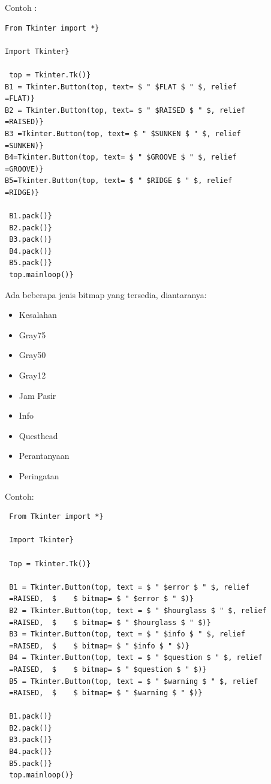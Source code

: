 \vspace{12pt}
Contoh : 
\begin{verbatim}
From Tkinter import *} 

Import Tkinter} 

 top = Tkinter.Tk()} 
B1 = Tkinter.Button(top, text= $ " $FLAT $ " $, relief
=FLAT)} 
B2 = Tkinter.Button(top, text= $ " $RAISED $ " $, relief
=RAISED)} 
B3 =Tkinter.Button(top, text= $ " $SUNKEN $ " $, relief
=SUNKEN)} 
B4=Tkinter.Button(top, text= $ " $GROOVE $ " $, relief
=GROOVE)} 
B5=Tkinter.Button(top, text= $ " $RIDGE $ " $, relief
=RIDGE)} 

 B1.pack()} 
 B2.pack()} 
 B3.pack()} 
 B4.pack()} 
 B5.pack()} 
 top.mainloop()} 
 \end{verbatim}
 
Ada beberapa jenis bitmap yang tersedia, diantaranya:  
\begin{itemize}
\item Kesalahan 
 
\item Gray75 
 
\item Gray50 
 
\item Gray12 
 
\item Jam Pasir 
 
\item Info 
 
\item Questhead 
 
\item Perantanyaan  
 
\item Peringatan\end{itemize}
 
\vspace{12pt}
Contoh: 
\begin{verbatim}
 From Tkinter import *} 
 
 Import Tkinter} 

 Top = Tkinter.Tk()} 

 B1 = Tkinter.Button(top, text = $ " $error $ " $, relief
 =RAISED,  $    $ bitmap= $ " $error $ " $)} 
 B2 = Tkinter.Button(top, text = $ " $hourglass $ " $, relief
 =RAISED,  $    $ bitmap= $ " $hourglass $ " $)} 
 B3 = Tkinter.Button(top, text = $ " $info $ " $, relief
 =RAISED,  $    $ bitmap= $ " $info $ " $)} 
 B4 = Tkinter.Button(top, text = $ " $question $ " $, relief
 =RAISED,  $    $ bitmap= $ " $question $ " $)} 
 B5 = Tkinter.Button(top, text = $ " $warning $ " $, relief
 =RAISED,  $    $ bitmap= $ " $warning $ " $)} 

 B1.pack()} 
 B2.pack()} 
 B3.pack()} 
 B4.pack()} 
 B5.pack()} 
 top.mainloop()} 
\end{verbatim}

